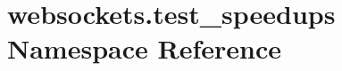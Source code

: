 \hypertarget{namespacewebsockets_1_1test__speedups}{}\section{websockets.\+test\+\_\+speedups Namespace Reference}
\label{namespacewebsockets_1_1test__speedups}
